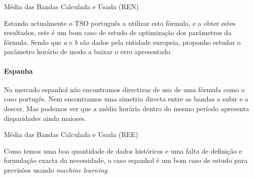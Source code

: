 \begin{table}[H]
	\centering
    \caption{Média das Bandas Calculada e Usada (REN)}    
    \resizebox{!}{!}{}
    \label{tab:media_bandas_pt}
    \end{table}

Estando actualmente o \gls{TSO} português a utilizar esta fórmula, e a obter estes resultados, este é um bom caso de estudo de optimização dos parâmetros da fórmula. Sendo que \textit{a} e \textit{b} são dados pela entidade europeia, proponho estudar o parâmetro horário de modo a baixar o erro apresentado.\par

\paragraph{Espanha \label{se:prev_espanha}}
\text{ }  \par

No mercado espanhol não encontramos directivas de uso de uma fórmula como o caso portugês. Nem encontramos uma simetria directa entre as bandas a subir e a descer. Mas podemos ver que a média horária dentro do mesmo período apresenta disparidades ainda maiores.\par

\begin{table}[H]
	\centering
    \caption{Média das Bandas Calculada e Usada (REE)}    
    \resizebox{!}{!}{}
    \label{tab:media_bandas_es}
    \end{table}


Como temos uma boa quantidade de dados históricos e uma falta de definição e formulação exacta da necessidade, o caso espanhol é um bom caso de estudo para previsões usando \textit{machine learning}.\par




\thispagestyle{plain}
